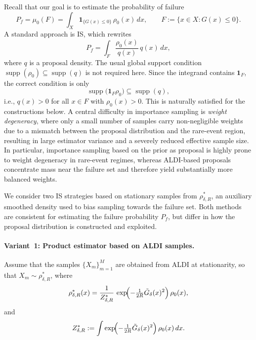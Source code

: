 \documentclass[a4paper]{article}
\numberwithin{equation}{section}
\begin{document}
Recall that our goal is to estimate the probability of failure
\[
  P_f = \mu_0(F)
      = \int_X \mathbf{1}_{\{G(x)\le 0\}}\,\rho_0(x)\,dx,
  \qquad F := \{x\in X : G(x)\le 0\}.
\]
A standard approach is IS, which rewrites
\[
  P_f
  = \int_F \frac{\rho_0(x)}{q(x)}\, q(x)\,dx,
\]
where $q$ is a proposal density. The usual global support condition
$\operatorname{supp}(\rho_0)\subseteq \operatorname{supp}(q)$ is not required here.
Since the integrand contains $\mathbf{1}_{F}$, the correct condition is only
\begin{equation}
  \label{eq:support-cond-F}
  \operatorname{supp}\bigl(\mathbf{1}_{F}\rho_0\bigr)
    \subseteq \operatorname{supp}(q),
\end{equation}
i.e., $q(x)>0$ for all $x\in F$ with $\rho_0(x)>0$.
This is naturally satisfied for the constructions below. A central difficulty in importance sampling is \emph{weight degeneracy}, where only a small number of samples carry non-negligible weights due to a mismatch between the proposal distribution and the rare-event region, resulting in large estimator variance and a severely reduced effective sample size. In particular, importance sampling based on the prior as proposal is highly prone to weight degeneracy in rare-event regimes, whereas ALDI-based proposals concentrate mass near the failure set and therefore yield substantially more balanced weights.

We consider two IS strategies based on stationary samples from
$\rho^*_{\delta,R}$, an auxiliary smoothed density used to bias sampling
towards the failure set.
Both methods are consistent for estimating the failure probability $P_f$,
but differ in how the proposal distribution is constructed and exploited.

\paragraph{Variant~1: Product estimator based on ALDI samples.}
Assume that the samples $\{X_m\}_{m=1}^M$ are obtained from ALDI at stationarity,
so that $X_m\sim \rho^*_{\delta,R}$, where
\[
  \rho^*_{\delta,R}(x)
  = \frac{1}{Z^*_{\delta,R}}\,
    \exp\!\Bigl(-\tfrac{1}{2R}\tilde G_\delta(x)^2\Bigr)\,\rho_0(x),
\]
and
\[
  Z^*_{\delta,R}
  := \int \exp\!\Bigl(-\tfrac{1}{2R}\tilde G_\delta(x)^2\Bigr)\,\rho_0(x)\,dx .
\]
\end{document}
